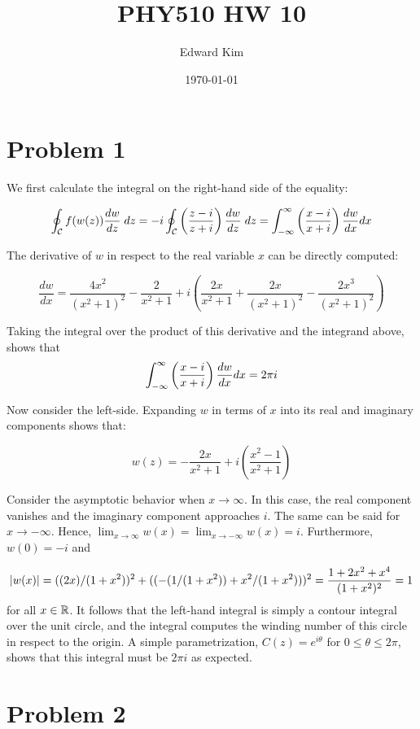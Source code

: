 \documentclass[12pt]{article}%
\title{PHY510 HW 10}
\author{Edward Kim}
\date{\today}
\newcommand{\contint}[1][\mathcal{C}]{\oint_{#1}}
\begin{document}
\maketitle
\section{Problem 1}

We first calculate the integral on the right-hand side of the equality:

\begin{align*}
  \contint f(w(z)) \frac{dw}{dz} \; dz = -i \contint \left(\frac{z - i}{z + i} \right) \frac{dw}{dz} \; dz = \doubinfint \left(\frac{x - i}{x + i} \right) \frac{dw}{dx} dx
\end{align*}

The derivative of $w$ in respect to the real variable $x$ can be directly computed:

\[ \frac{dw}{dx} = \frac{4 x^2}{\left(x^2+1\right)^2}-\frac{2}{x^2+1}+i \left(\frac{2 x}{x^2+1}+\frac{2 x}{\left(x^2+1\right)^2}-\frac{2 x^3}{\left(x^2+1\right)^2}\right) \]

Taking the integral over the product of this derivative and the integrand above, shows that
\[\int_{-\infty}^{\infty} \left(\frac{x - i}{x + i} \right) \frac{dw}{dx} dx = 2\pi i\]

Now consider the left-side. Expanding $w$ in terms of $x$ into its real and imaginary components shows that:

\[ w(z) = -\frac{2 x}{x^2+1}+i \left(\frac{x^2-1}{x^2+1}\right) \]

Consider the asymptotic behavior when $x \rightarrow \infty$. In this case, the real component vanishes and the imaginary component approaches $i$. The same can be said for $x \rightarrow - \infty$. Hence, $\lim_{x \rightarrow \infty} w(x) = \lim_{x \rightarrow -\infty} w(x) = i$. Furthermore, $w(0) = -i$ and

\[ \abs{w(x)} = ((2 x)/(1 + x^2))^2 + ((-(1/(1 + x^2)) + x^2/(1 + x^2)))^2 = \frac{1 + 2x^2 + x^4}{(1+x^2)^2} = 1\]
for all $x \in {\mathbb{R}}$. It follows that the left-hand integral is simply a contour integral over the unit circle, and the integral computes the winding number of this circle in respect to the origin. A simple parametrization, $C(z) = e^{i\theta}$ for $0 \leq \theta \leq 2\pi$, shows that this integral must be $2\pi i$ as expected.

\section{Problem 2}
\end{document}

